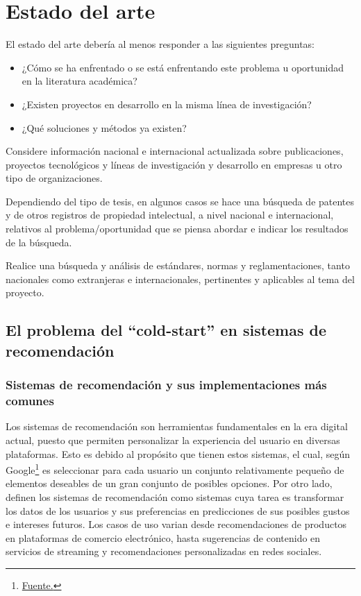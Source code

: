 
\chapter{Estado del arte} %
\label{sec:Estado Arte} %

El estado del arte debería al menos responder a las siguientes preguntas:
\begin{itemize}
	\item ¿Cómo se ha enfrentado o se está enfrentando este problema u oportunidad en la literatura académica? 
	\item ¿Existen proyectos en desarrollo en la misma línea de investigación? 
	\item ¿Qué soluciones y métodos ya existen? 
\end{itemize}

Considere información nacional e internacional actualizada sobre publicaciones, proyectos tecnológicos y líneas de investigación y desarrollo en empresas u otro tipo de organizaciones. 

Dependiendo del tipo de tesis, en algunos casos se hace una búsqueda de patentes y de otros registros de propiedad intelectual, a nivel nacional e internacional, relativos al problema/oportunidad que se piensa abordar e indicar los resultados de la búsqueda. 

Realice una búsqueda y análisis de estándares, normas y reglamentaciones, tanto nacionales como extranjeras e internacionales, pertinentes y aplicables al tema del proyecto.

\newpage



\section{El problema del \enquote{cold-start} en sistemas de recomendación}

	\subsection{Sistemas de recomendación y sus implementaciones más comunes}
		Los sistemas de recomendación son herramientas fundamentales en la era digital actual, puesto que permiten personalizar la experiencia del usuario en diversas plataformas. Esto es debido al propósito que tienen estos sistemas, el cual, según Google\footnote{\href{https://developers.google.com/machine-learning/glossary}{Fuente.}} es seleccionar para cada usuario un conjunto relativamente pequeño de elementos deseables de un gran conjunto de posibles opciones. Por otro lado, \cite{L__2012} definen los sistemas de recomendación como sistemas cuya tarea es transformar los datos de los usuarios y sus preferencias en predicciones de sus posibles gustos e intereses futuros. Los casos de uso varian desde recomendaciones de productos en plataformas de comercio electrónico, hasta sugerencias de contenido en servicios de streaming y recomendaciones personalizadas en redes sociales.

